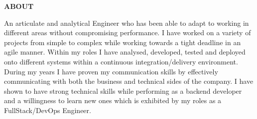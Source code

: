 \documentclass[10pt, a4paper]{article}
\begin{document}
    \vspace*{0.5in}
    {\large {} \enspace \textbf{ABOUT}} \par
    An articulate and analytical Engineer who has been able to adapt to working in different areas without compromising performance. I have worked on a variety of projects from simple to complex while working towards a tight deadline in an agile manner. Within my roles I have analysed, developed, tested and deployed onto different systems within a continuous integration/delivery environment. During my years I have proven my communication skills by effectively communicating with both the business and technical sides of the company. I have shown to have strong technical skills while performing as a backend developer and a willingness to learn new ones which is exhibited by my roles as a FullStack/DevOps Engineer. \par
\end{document}
